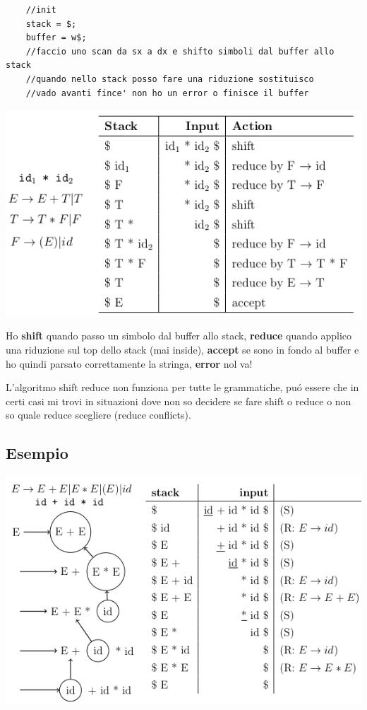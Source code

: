 \begin{lstlisting}
    //init
    stack = $;
    buffer = w$;
    //faccio uno scan da sx a dx e shifto simboli dal buffer allo stack 
    //quando nello stack posso fare una riduzione sostituisco
    //vado avanti fince' non ho un error o finisce il buffer
\end{lstlisting}

\begin{center}
    \includegraphics[scale=0.6]{Chapters/Img/c04_04.png}\\
\end{center}

Ho \textbf{shift} quando passo un simbolo dal buffer allo stack, \textbf{reduce} quando applico una riduzione sul top dello stack 
(mai inside), \textbf{accept} se sono in fondo al buffer e ho quindi parsato correttamente la stringa, \textbf{error} nol va!

L'algoritmo shift reduce non funziona per tutte le grammatiche, pu\'o essere che in certi casi mi trovi in situazioni dove non 
so decidere se fare shift o reduce o non so quale reduce scegliere (reduce conflicts).

\subsection{Esempio}

\begin{center}
    \includegraphics[scale=0.6]{Chapters/Img/c04_05.png}\\
\end{center}

